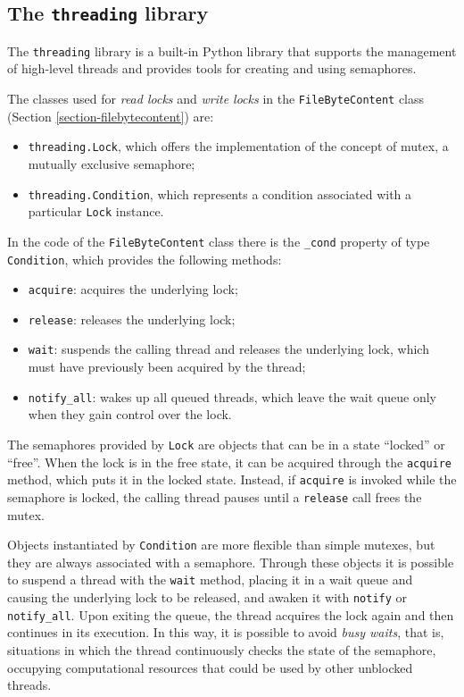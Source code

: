 \documentclass[a4paper,12pt,twoside,openright]{report}
\begin{document}
  \subsection{The \texttt{threading} library}
  \label{section-lib-threading}

  The \texttt{threading} library \cite{pythreading} is a built-in Python library that
  supports the management of high-level threads and provides tools for creating and using semaphores.
  
  The classes used for \textit{read locks} and \textit{write locks} in the \texttt{FileByteContent} class
  (Section \ref{section-filebytecontent}) are:
  \begin{itemize}
    \item \texttt{threading.Lock}, which offers the implementation of the concept of mutex, a mutually exclusive semaphore;
    \item \texttt{threading.Condition}, which represents a condition associated with a particular \texttt{Lock} instance.
  \end{itemize}

  In the code of the \texttt{FileByteContent} class there is the \texttt{\_cond} property of type \texttt{Condition},
  which provides the following methods:
  \begin{itemize}
    \item \texttt{acquire}: acquires the underlying lock;
    \item \texttt{release}: releases the underlying lock;
    \item \texttt{wait}: suspends the calling thread and releases the underlying lock, which must have previously been acquired by the thread;
    \item \texttt{notify\_all}: wakes up all queued threads, which leave the wait queue only when they gain control over the lock.
  \end{itemize}
  
  The semaphores provided by \texttt{Lock} are objects that can be in a state ``locked'' or ``free''.
  When the lock is in the free state, it can be acquired through the \texttt{acquire} method, which puts it in the locked state.
  Instead, if \texttt{acquire} is invoked while the semaphore is locked, the calling
  thread pauses until a \texttt{release} call frees the mutex.

  Objects instantiated by \texttt{Condition} are more flexible than simple mutexes,
  but they are always associated with a semaphore.
  Through these objects it is possible to suspend a thread with the \texttt{wait} method, placing it in a wait queue
  and causing the underlying lock to be released, and awaken it with \texttt{notify} or \texttt{notify\_all}.
  Upon exiting the queue, the thread acquires the lock again and then continues in its execution.
  In this way, it is possible to avoid \textit{busy waits}, that is, situations in which the thread continuously
  checks the state of the semaphore, occupying computational resources that could be used by other unblocked threads.
  
\end{document}
